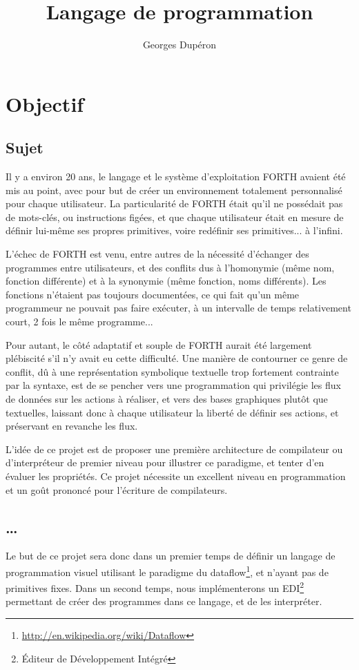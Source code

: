 \documentclass{article}
\author{Georges Dupéron}
\title{Langage de programmation}
\begin{document}
\maketitle
\tableofcontents
\newpage

\section{Objectif}

\subsection{Sujet}
Il y a environ 20 ans, le langage et le système d'exploitation FORTH avaient été mis au point, avec pour but de créer un environnement
totalement personnalisé pour chaque utilisateur. La particularité de FORTH était qu'il ne possédait pas de mots-clés, ou instructions
figées, et que chaque utilisateur était en mesure de définir lui-même ses propres primitives, voire redéfinir ses primitives... à
l'infini.

L'échec de FORTH est venu, entre autres de la nécessité d'échanger des programmes entre utilisateurs, et des conflits dus à l'homonymie
(même nom, fonction différente) et à la synonymie (même fonction, noms différents). %
Les fonctions n'étaient pas toujours documentées, ce qui fait qu'un même programmeur ne pouvait pas faire exécuter, à un intervalle de
temps relativement court, 2 fois le même programme...

Pour autant, le côté adaptatif et souple de FORTH aurait été largement plébiscité s'il n'y avait eu cette difficulté. Une manière de
contourner ce genre de conflit, dû à une représentation symbolique textuelle trop fortement contrainte par la syntaxe, est de se pencher
vers une programmation qui privilégie les flux de données sur les actions à réaliser, et vers des bases graphiques plutôt que textuelles,
laissant donc à chaque utilisateur la liberté de définir ses actions, et préservant en revanche les flux.

L'idée de ce projet est de proposer une première architecture de compilateur ou d'interpréteur de premier niveau pour illustrer ce
paradigme, et tenter d'en évaluer les propriétés. Ce projet nécessite un excellent niveau en programmation et un goût prononcé pour
l'écriture de compilateurs.

\subsection{…}
Le but de ce projet sera donc dans un premier temps de définir un langage de programmation visuel utilisant le paradigme du
dataflow\footnote{\url{http://en.wikipedia.org/wiki/Dataflow}}, et n'ayant pas de primitives fixes. Dans un second temps, nous
implémenterons un EDI\footnote{Éditeur de Développement Intégré} permettant de créer des programmes dans ce langage, et de les interpréter.
\end{document}
